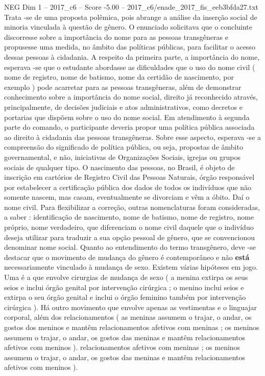 \begin{textsample}{NEG Dim 1 – 2017\_c6 – Score -5.00 – 2017\_c6/enade\_2017\_fis\_eeb3bfda27.txt}
Trata -se de uma proposta polêmica, pois abrange a análise da inserção social de minoria vinculada à questão de gênero.
O enunciado solicitava que o concluinte discorresse sobre a importância do nome para as pessoas transgêneras e propusesse uma medida, no âmbito das políticas públicas, para facilitar o acesso dessas pessoas à cidadania.
A respeito da primeira parte, a importância do nome, esperava -se que o estudante abordasse as dificuldades que o uso do nome civil ( nome de registro, nome de batismo, nome da certidão de nascimento, por exemplo ) pode acarretar para as pessoas transgêneras, além de demonstrar conhecimento sobre a importância do nome social, direito já reconhecido através, principalmente, de decisões judiciais e atos administrativos, como decretos e portarias que dispõem sobre o uso do nome social.
Em atendimento à segunda parte do comando, o participante deveria propor uma política pública associada ao direito à cidadania das pessoas transgêneras.
Sobre esse aspecto, esperava -se a compreensão do significado de política pública, ou seja, propostas de âmbito governamental, e não, iniciativas de Organizações Sociais, igrejas ou grupos sociais de qualquer tipo.
O nascimento das pessoas, no Brasil, é objeto de inscrição em cartórios de Registro Civil das Pessoas Naturais, órgão responsável por estabelecer a certificação pública dos dados de todos os indivíduos que não somente nascem, mas casam, eventualmente se divorciam e vêm a óbito.
Daí o nome civil.
Para flexibilizar a correção, outras nomenclaturas foram consideradas, a saber : identificação de nascimento, nome de batismo, nome de registro, nome próprio, nome verdadeiro, que diferenciam o nome civil daquele que o indivíduo deseja utilizar para traduzir a sua opção pessoal de gênero, que se convencionou denominar nome social.
Quanto ao entendimento do termo transgênero, deve -se destacar que o movimento de mudança do gênero é contemporâneo e não \textbf{está} necessariamente vinculado à mudança de sexo.
Existem várias hipóteses em jogo.
Uma é a que envolve cirurgias de mudança de sexo ( a menina extirpa os seus seios e inclui órgão genital por intervenção cirúrgica ; o menino inclui seios e extirpa o seu órgão genital e inclui o órgão feminino também por intervenção cirúrgica ).
Há outro movimento que envolve apenas as vestimentas e o linguajar corporal, além dos relacionamentos ( as meninas assumem o trajar, o andar, os gostos dos meninos e mantêm relacionamentos afetivos com meninas ; os meninos assumem o trajar, o andar, os gostos das meninas e mantêm relacionamentos afetivos com meninos ). relacionamentos afetivos com meninas ; os meninos assumem o trajar, o andar, os gostos das meninas e mantêm relacionamentos afetivos com meninos ).

\end{textsample}
